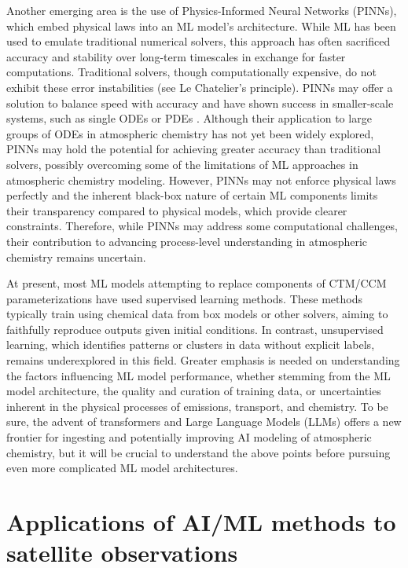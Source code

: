 \documentclass[gmd, manuscript]{copernicus}
\begin{document}
Another emerging area is the use of Physics-Informed Neural Networks (PINNs), which embed physical laws into an ML model’s architecture. While ML has been used to emulate traditional numerical solvers, this approach has often sacrificed accuracy and stability over long-term timescales in exchange for faster computations. Traditional solvers, though computationally expensive, do not exhibit these error instabilities (see Le Chatelier’s principle). PINNs may offer a solution to balance speed with accuracy and have shown success in smaller-scale systems, such as single ODEs or PDEs \citep{karniadakis_physics-informed_2021}. Although their application to large groups of ODEs in atmospheric chemistry has not yet been widely explored, PINNs may hold the potential for achieving greater accuracy than traditional solvers, possibly overcoming some of the limitations of ML approaches in atmospheric chemistry modeling. However, PINNs may not enforce physical laws perfectly and the inherent black-box nature of certain ML components limits their transparency compared to physical models, which provide clearer constraints. Therefore, while PINNs may address some computational challenges, their contribution to advancing process-level understanding in atmospheric chemistry remains uncertain.

At present, most ML models attempting to replace components of CTM/CCM parameterizations have used supervised learning methods. These methods typically train using chemical data from box models or other solvers, aiming to faithfully reproduce outputs given initial conditions. In contrast, unsupervised learning, which identifies patterns or clusters in data without explicit labels, remains underexplored in this field. Greater emphasis is needed on understanding the factors influencing ML model performance, whether stemming from the ML model architecture, the quality and curation of training data, or uncertainties inherent in the physical processes of emissions, transport, and chemistry. To be sure, the advent of transformers and Large Language Models (LLMs) offers a new frontier for ingesting and potentially improving AI modeling of atmospheric chemistry, but it will be crucial to understand the above points before pursuing even more complicated ML model architectures.


\section{Applications of AI/ML methods to satellite observations}
\end{document}
